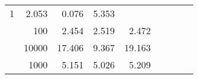 \begin{table}
\begin{tabular}{rrrrrrrrr}
					\multirow{ 1 }{*}{ 1 } &
					
						
							    
							    
	                           2.053 & 0.076 & 5.353  \\
	                
	            
					 &  
					 
					\multirow{ 1 }{*}{ 100 } &
					
						
							    
							    
	                           2.454 & 2.519 & 2.472  \\
	                
	            
					 &  
					 
					\multirow{ 1 }{*}{ 10000 } &
					
						
							    
							    
	                           17.406 & 9.367 & 19.163  \\
	                
	            
	        
				\noalign{\smallskip}\hline
				\multirow{ 1 }{*}{ 2000000 } &
				
					
					 
					\multirow{ 1 }{*}{ 1000 } &
					
						
							    
							    
	                           5.151 & 5.026 & 5.209  \\
	                
	            
	        

\hline

\end{tabular}
\end{table}
\clearpage


	    

